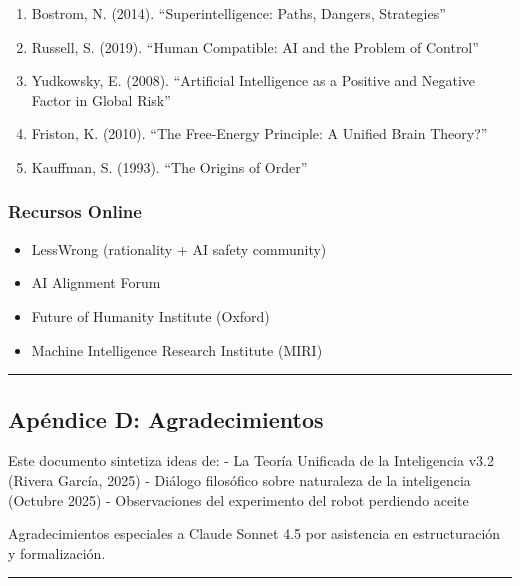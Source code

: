 \begin{enumerate}
\def\labelenumi{\arabic{enumi}.}
\tightlist
\item
  Bostrom, N. (2014). ``Superintelligence: Paths, Dangers, Strategies''
\item
  Russell, S. (2019). ``Human Compatible: AI and the Problem of
  Control''
\item
  Yudkowsky, E. (2008). ``Artificial Intelligence as a Positive and
  Negative Factor in Global Risk''
\item
  Friston, K. (2010). ``The Free-Energy Principle: A Unified Brain
  Theory?''
\item
  Kauffman, S. (1993). ``The Origins of Order''
\end{enumerate}

\subsubsection{Recursos Online}\label{recursos-online}

\begin{itemize}
\tightlist
\item
  LessWrong (rationality + AI safety community)
\item
  AI Alignment Forum
\item
  Future of Humanity Institute (Oxford)
\item
  Machine Intelligence Research Institute (MIRI)
\end{itemize}

\begin{center}\rule{0.5\linewidth}{0.5pt}\end{center}

\subsection{Apéndice D:
Agradecimientos}\label{apuxe9ndice-d-agradecimientos}

Este documento sintetiza ideas de: - La Teoría Unificada de la
Inteligencia v3.2 (Rivera García, 2025) - Diálogo filosófico sobre
naturaleza de la inteligencia (Octubre 2025) - Observaciones del
experimento del robot perdiendo aceite

Agradecimientos especiales a Claude Sonnet 4.5 por asistencia en
estructuración y formalización.

\begin{center}\rule{0.5\linewidth}{0.5pt}\end{center}

